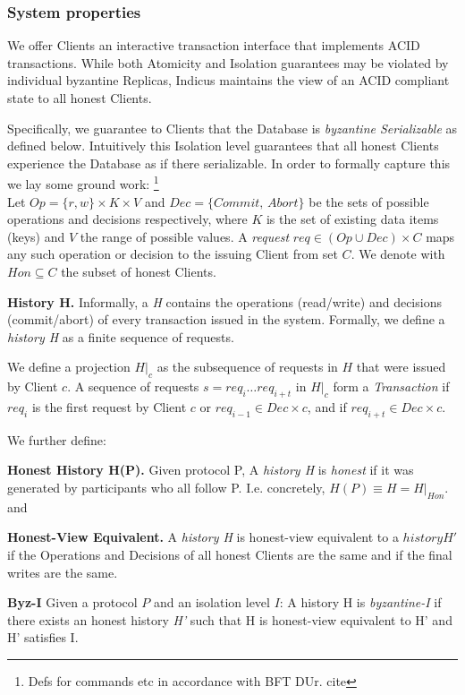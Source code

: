 \subsubsection{System properties}
We offer Clients an interactive transaction interface that implements ACID transactions. While both Atomicity and Isolation guarantees may be violated by individual byzantine Replicas, Indicus maintains the view of an ACID compliant state to all honest Clients. 

Specifically, we guarantee to Clients that the Database is \textit{byzantine Serializable} as defined below. Intuitively this Isolation level guarantees that all honest Clients experience the Database as if there serializable. In order to formally capture this we lay some ground work: \footnote{Defs for commands etc in accordance with BFT DUr. cite}\\

Let $Op =  \{r, w\} \times K \times V $ and $Dec = \{Commit, \,Abort\}$ be the sets of possible operations and decisions respectively, where $K$ is the set of existing data items (keys) and $V$ the range of possible values. A \textit{request} $req \in (Op \cup Dec) \times C$ maps any such operation or decision to the issuing Client from set $C$. We denote with $Hon \subseteq C$ the subset of honest Clients. 

\textbf{History H.} Informally, a \textit{H} contains the operations (read/write) and decisions (commit/abort) of every transaction issued in the system. Formally, we define a \textit{history H} as a finite sequence of requests.

We define a projection $H|_c$ as the subsequence of requests in $H$ that were issued by Client $c$. A sequence of requests $s = req_i \dots req_{i+t}$ in $H|_c$ form a \textit{Transaction} if $req_i$ is the first request by Client $c$ or $req_{i-1} \in Dec \times c$, and if $req_{i+t} \in Dec \times c$.

We further define:

\textbf{Honest History H(P).} Given protocol P, A \textit{history H} is \textit{honest} if it was generated by participants who all follow P. I.e. concretely, $H(P) \equiv H = H|_{Hon}$.
and

\textbf{Honest-View Equivalent.} A \textit{history H} is honest-view equivalent to a $history H'$ if the Operations and Decisions of all honest Clients are the same and if the final writes are the same.

\textbf{Byz-I} Given a protocol $P$ and an isolation level $I$:
A history H is \textit{byzantine-I} if there exists an honest history \textit{H'} such that H is honest-view equivalent to H' and H' satisfies I. \\

